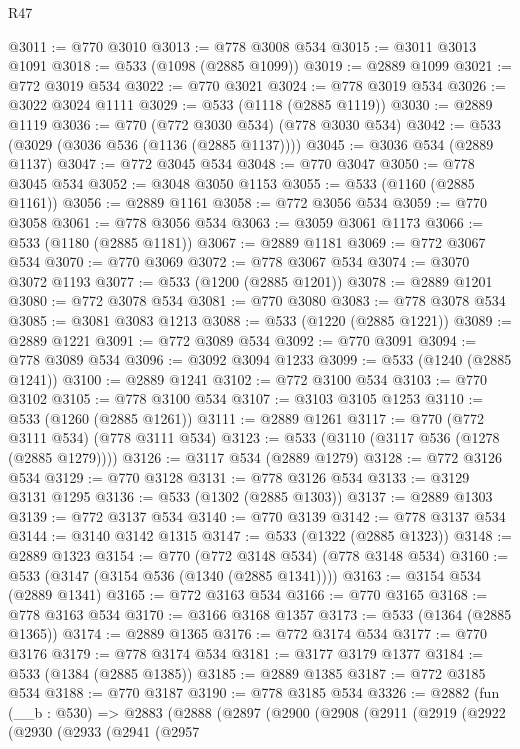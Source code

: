 \begin{lexlean}{R47}
\begin{coremodule}
@3011 := @770 @3010
@3013 := @778 @3008 @534
@3015 := @3011 @3013 @1091
@3018 := @533 (@1098 (@2885 @1099))
@3019 := @2889 @1099
@3021 := @772 @3019 @534
@3022 := @770 @3021
@3024 := @778 @3019 @534
@3026 := @3022 @3024 @1111
@3029 := @533 (@1118 (@2885 @1119))
@3030 := @2889 @1119
@3036 := @770 (@772 @3030 @534) (@778 @3030 @534)
@3042 := @533 (@3029 (@3036 @536 (@1136 (@2885 @1137))))
@3045 := @3036 @534 (@2889 @1137)
@3047 := @772 @3045 @534
@3048 := @770 @3047
@3050 := @778 @3045 @534
@3052 := @3048 @3050 @1153
@3055 := @533 (@1160 (@2885 @1161))
@3056 := @2889 @1161
@3058 := @772 @3056 @534
@3059 := @770 @3058
@3061 := @778 @3056 @534
@3063 := @3059 @3061 @1173
@3066 := @533 (@1180 (@2885 @1181))
@3067 := @2889 @1181
@3069 := @772 @3067 @534
@3070 := @770 @3069
@3072 := @778 @3067 @534
@3074 := @3070 @3072 @1193
@3077 := @533 (@1200 (@2885 @1201))
@3078 := @2889 @1201
@3080 := @772 @3078 @534
@3081 := @770 @3080
@3083 := @778 @3078 @534
@3085 := @3081 @3083 @1213
@3088 := @533 (@1220 (@2885 @1221))
@3089 := @2889 @1221
@3091 := @772 @3089 @534
@3092 := @770 @3091
@3094 := @778 @3089 @534
@3096 := @3092 @3094 @1233
@3099 := @533 (@1240 (@2885 @1241))
@3100 := @2889 @1241
@3102 := @772 @3100 @534
@3103 := @770 @3102
@3105 := @778 @3100 @534
@3107 := @3103 @3105 @1253
@3110 := @533 (@1260 (@2885 @1261))
@3111 := @2889 @1261
@3117 := @770 (@772 @3111 @534) (@778 @3111 @534)
@3123 := @533 (@3110 (@3117 @536 (@1278 (@2885 @1279))))
@3126 := @3117 @534 (@2889 @1279)
@3128 := @772 @3126 @534
@3129 := @770 @3128
@3131 := @778 @3126 @534
@3133 := @3129 @3131 @1295
@3136 := @533 (@1302 (@2885 @1303))
@3137 := @2889 @1303
@3139 := @772 @3137 @534
@3140 := @770 @3139
@3142 := @778 @3137 @534
@3144 := @3140 @3142 @1315
@3147 := @533 (@1322 (@2885 @1323))
@3148 := @2889 @1323
@3154 := @770 (@772 @3148 @534) (@778 @3148 @534)
@3160 := @533 (@3147 (@3154 @536 (@1340 (@2885 @1341))))
@3163 := @3154 @534 (@2889 @1341)
@3165 := @772 @3163 @534
@3166 := @770 @3165
@3168 := @778 @3163 @534
@3170 := @3166 @3168 @1357
@3173 := @533 (@1364 (@2885 @1365))
@3174 := @2889 @1365
@3176 := @772 @3174 @534
@3177 := @770 @3176
@3179 := @778 @3174 @534
@3181 := @3177 @3179 @1377
@3184 := @533 (@1384 (@2885 @1385))
@3185 := @2889 @1385
@3187 := @772 @3185 @534
@3188 := @770 @3187
@3190 := @778 @3185 @534
@3326 := @2882
    (fun (__b : @530) =>
    @2883
      (@2888
        (@2897
          (@2900
            (@2908
              (@2911
                (@2919
                  (@2922
                    (@2930
                      (@2933
                        (@2941
                          (@2957

\end{coremodule}
\end{lexlean}
